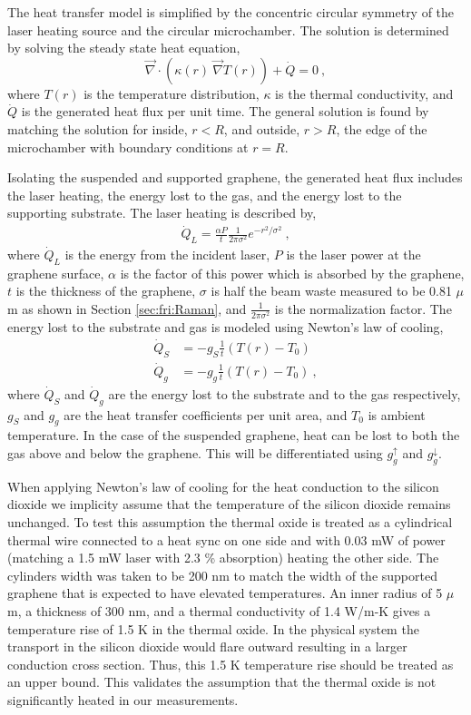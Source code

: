 The heat transfer model is simplified by the concentric circular symmetry of the laser heating source and the circular microchamber.
The solution is determined by solving the steady state heat equation,
\begin{equation*}
	\vec{\nabla} \cdot \left(\kappa(r) \ \vec{\nabla} T(r) \right) + \dot{Q}=0 \ ,
	\label{eq:therm:heateq}
\end{equation*}
where $T(r)$ is the temperature distribution, $\kappa$ is the thermal conductivity, and $\dot{Q}$ is the generated heat flux per unit time.
The general solution is found by matching the solution for inside, $r<R$, and outside, $r>R$, the edge of the microchamber with boundary conditions at $r=R$.

Isolating the suspended and supported graphene, the generated heat flux includes the laser heating, the energy lost to the gas, and the energy lost to the supporting substrate.
The laser heating is described by,
\begin{align}
	\dot{Q}_{L}=\frac{\alpha P}{t} \frac{1}{2 \pi \sigma^2} e^{-r^2/\sigma^2} \ ,
\end{align}
where $\dot{Q}_L$ is the energy from the incident laser, $P$ is the laser power at the graphene surface, $\alpha$ is the factor of this power which is absorbed by the graphene, $t$ is the thickness of the graphene, $\sigma$ is half the beam waste measured to be 0.81 $\mu$m as shown in Section \ref{sec:fri:Raman}, and $\frac{1}{2 \pi \sigma^2}$ is the normalization factor.
The energy lost to the substrate and gas is modeled using Newton's law of cooling,
\begin{align*}
	\dot{Q}_{S}&=-g_S \frac{1}{t} \left(T(r)-T_0 \right) \\
	\dot{Q}_{g}&=-g_g \frac{1}{t} \left(T(r)-T_0 \right) \ ,
\end{align*}
where $\dot{Q}_{S}$ and $\dot{Q}_g$ are the energy lost to the substrate and to the gas respectively, $g_S$ and $g_g$ are the heat transfer coefficients per unit area, and $T_0$ is ambient temperature.
In the case of the suspended graphene, heat can be lost to both the gas above and below the graphene.
This will be differentiated using $g_g^{\uparrow}$ and $g_g^{\downarrow}$.

When applying Newton's law of cooling for the heat conduction to the silicon dioxide we implicity assume that the temperature of the silicon dioxide remains unchanged.
To test this assumption the thermal oxide is treated as a cylindrical thermal wire connected to a heat sync on one side and with 0.03 mW of power (matching a 1.5 mW laser with 2.3 \% absorption) heating the other side.
The cylinders width was taken to be 200 nm to match the width of the supported graphene that is expected to have elevated temperatures.
An inner radius of 5 $\mu$m, a thickness of 300 nm, and a thermal conductivity of 1.4 W/m-K \cite{} gives a temperature rise of 1.5 K in the thermal oxide.
In the physical system the transport in the silicon dioxide would flare outward resulting in a larger conduction cross section.
Thus, this 1.5 K temperature rise should be treated as an upper bound.
This validates the assumption that the thermal oxide is not significantly heated in our measurements.

